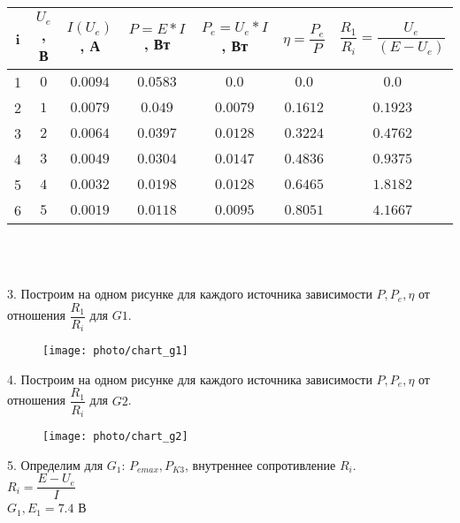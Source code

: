 \begin{tabular}{|c|c|c|c|c|c|c|}
    \hline
    i & $ U_e $, В & $ I(U_e) $, А & $ P = E*I $, Вт & $ P_e = U_e*I $, Вт & $ \eta = \dfrac{P_e}{P} $ & $ \dfrac{R_1}{R_i} = \dfrac{U_e}{(E - U_e)} $\\
    \hline
    1 & $ 0 $ & $ 0.0094 $ & $ 0.0583 $ & $ 0.0 $ & $ 0.0 $ & $ 0.0 $\\
    \hline
    2 & $ 1 $ & $ 0.0079 $ & $ 0.049 $ & $ 0.0079 $ & $ 0.1612 $ & $ 0.1923 $\\
    \hline
    3 & $ 2 $ & $ 0.0064 $ & $ 0.0397 $ & $ 0.0128 $ & $ 0.3224 $ & $ 0.4762 $\\
    \hline
    4 & $ 3 $ & $ 0.0049 $ & $ 0.0304 $ & $ 0.0147 $ & $ 0.4836 $ & $ 0.9375 $\\
    \hline
    5 & $ 4 $ & $ 0.0032 $ & $ 0.0198 $ & $ 0.0128 $ & $ 0.6465 $ & $ 1.8182 $\\
    \hline
    6 & $ 5 $ & $ 0.0019 $ & $ 0.0118 $ & $ 0.0095 $ & $ 0.8051 $ & $ 4.1667 $\\
    \hline
\end{tabular}
\\
\\

\newpage

3. Построим на одном рисунке для каждого источника зависимости 
$ P, P_e, \eta $ от отношения $ \dfrac{R_1}{R_i} $ для $ G1 $.

\begin{figure}[hpt!]
    \centering
    \texttt{[image: photo/chart\_g1]}
\end{figure}

4. Построим на одном рисунке для каждого источника зависимости 
$ P, P_e, \eta $ от отношения $ \dfrac{R_1}{R_i} $ для $ G2 $.

\begin{figure}[hpt!]
    \centering
    \texttt{[image: photo/chart\_g2]}
\end{figure}

\newpage

5. Определим для $ G_1 $:
$ P_{e max}, P_{K3} $, внутреннее сопротивление $ R_i $.\\

$ R_i = \dfrac{E - U_e}{I} $\\

$ G_1, E_1 = 7.4 $ В

